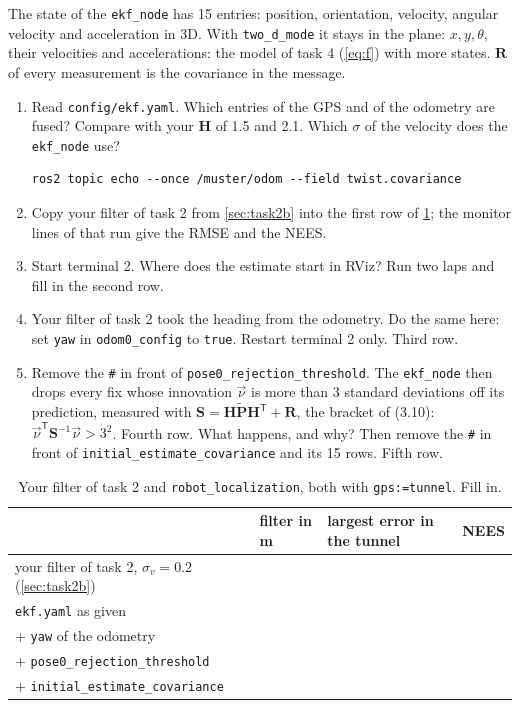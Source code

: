 \documentclass[11pt,a4paper,parskip=half]{scrartcl}
\newcommand{\thema}[1]{\texttt{#1}}
\newcommand{\datei}[1]{\texttt{#1}}
\newcommand{\mat}[1]{\mathbf{#1}}
\newcommand{\T}{^{\mathsf{T}}}
\begin{document}
\begin{note}
The state of the \thema{ekf\_node} has 15 entries: position, orientation, velocity, angular velocity and
acceleration in 3D. With \thema{two\_d\_mode} it stays in the plane: \(x, y, \theta\), their velocities and
accelerations: the model of task 4 (\cref{eq:f}) with more states. \(\mat R\) of every measurement is the covariance in the
message.
\end{note}

\begin{enumerate}
  \item Read \datei{config/ekf.yaml}. Which entries of the GPS and of the odometry are fused? Compare with your
        \(\mat H\) of 1.5 and 2.1. Which \(\sigma\) of the velocity does the \thema{ekf\_node} use?
\begin{lstlisting}
ros2 topic echo --once /muster/odom --field twist.covariance
\end{lstlisting}
  \item Copy your filter of task 2 from \cref{sec:task2b} into the first row of \cref{tab:ekf}; the monitor
        lines of that run give the RMSE and the NEES.
  \item Start terminal 2. Where does the estimate start in RViz? Run two laps and fill in the second row.
  \item Your filter of task 2 took the heading from the odometry. Do the same here: set \thema{yaw} in
        \thema{odom0\_config} to \thema{true}. Restart terminal 2 only. Third row.
  \item Remove the \thema{\#} in front of \thema{pose0\_rejection\_threshold}. The \thema{ekf\_node} then
        drops every fix whose innovation \(\vec\nu\) is more than 3 standard deviations off its prediction,
        measured with \(\mat S = \mat H \tilde{\mat P} \mat H\T + \mat R\), the bracket of (3.10):
        \(\vec\nu\T \mat S^{-1} \vec\nu > 3^2\). Fourth row. What happens, and why? Then remove the \thema{\#} in front of \thema{initial\_estimate\_covariance} and its 15 rows.
        Fifth row.
\end{enumerate}

\begin{table}[ht]\centering
\renewcommand{\arraystretch}{1.4}
\caption{Your filter of task 2 and \thema{robot\_localization}, both with \thema{gps:=tunnel}. Fill in.}
\label{tab:ekf}
\begin{tabular}{@{}p{6.0cm}p{2.4cm}p{2.8cm}p{1.8cm}@{}}
\toprule
& filter in m & largest error in the tunnel & NEES \\
\midrule
your filter of task 2, \(\sigma_v = 0.2\) (\cref{sec:task2b}) & & & \\
\datei{ekf.yaml} as given & & & \\
+ \thema{yaw} of the odometry & & & \\
+ \thema{pose0\_rejection\_threshold} & & & \\
+ \thema{initial\_estimate\_covariance} & & & \\
\bottomrule
\end{tabular}
\end{table}
\end{document}
